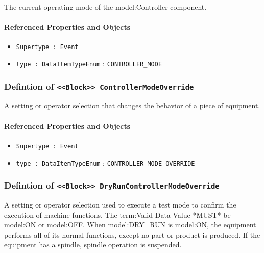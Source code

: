 \FloatBarrier

The current operating mode of the {model:Controller} component.

\FloatBarrier
\paragraph{Referenced Properties and Objects}

\begin{itemize}
\item \texttt{Supertype : Event}

\item \texttt{type : DataItemTypeEnum} : \texttt{CONTROLLER_MODE}

\end{itemize}
\FloatBarrier
\subsubsection{Defintion of \texttt{<<Block>> ControllerModeOverride}}
  \label{type:ControllerModeOverride}

\FloatBarrier

A setting or operator selection that changes the behavior of a piece of equipment.

\FloatBarrier
\paragraph{Referenced Properties and Objects}

\begin{itemize}
\item \texttt{Supertype : Event}

\item \texttt{type : DataItemTypeEnum} : \texttt{CONTROLLER_MODE_OVERRIDE}

\end{itemize}
\FloatBarrier
\subsubsection{Defintion of \texttt{<<Block>> DryRunControllerModeOverride}}
  \label{type:DryRunControllerModeOverride}

\FloatBarrier

A setting or operator selection used to execute a test mode to confirm the execution of machine functions. 
 The {term:Valid Data Value} *MUST* be {model:ON} or {model:OFF}. 
 When {model:DRY_RUN} is {model:ON}, the equipment performs all of its normal functions, except no part or product is produced.  If the equipment has a spindle, spindle operation is suspended.

